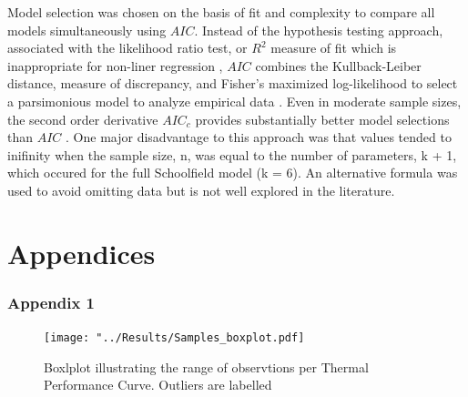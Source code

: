\documentclass[12pt]{article}
\begin{document}
\begin{linenumbers}
Model selection was chosen on the basis of fit and complexity to compare all models simultaneously using \(AIC\). Instead of the hypothesis testing approach, associated with the likelihood ratio test, or \(R^2\) measure of fit which is inappropriate for non-liner regression \cite{spiess2010evaluation}, \(AIC\) combines the Kullback-Leiber distance, measure of discrepancy, and Fisher's maximized log-likelihood to select a parsimonious model to analyze empirical data \cite{akaike1998information}.
Even in moderate sample sizes, the second order derivative \(AIC_c\) provides substantially better model selections than \(AIC\) \cite{10.1093/biomet/78.3.499}. One major disadvantage to this approach was that values tended to inifinity when the sample size, n, was equal to the number of parameters, k + 1, which occured for the full Schoolfield model (k = 6). An alternative formula was used to avoid omitting data but is not well explored in the literature. 






\end{linenumbers}

\section{Appendices}
\subsubsection{Appendix 1}
\begin{figure}
\texttt{[image: "../Results/Samples\_boxplot.pdf]}
\centering
\caption{Boxlplot illustrating the range of observtions per Thermal Performance Curve. Outliers are labelled}
\end{figure}

 
\end{document}
